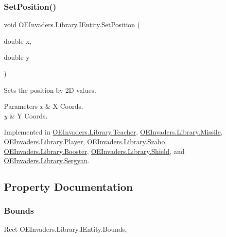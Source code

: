 \subsubsection{\texorpdfstring{SetPosition()}{SetPosition()}}
{\footnotesize\ttfamily void O\+E\+Invaders.\+Library.\+I\+Entity.\+Set\+Position (\begin{DoxyParamCaption}\item[{double}]{x,  }\item[{double}]{y }\end{DoxyParamCaption})}



Sets the position by 2D values. 


\begin{DoxyParams}{Parameters}
{\em x} & X Coords.\\
\hline
{\em y} & Y Coords.\\
\hline
\end{DoxyParams}


Implemented in \mbox{\hyperlink{class_o_e_invaders_1_1_library_1_1_teacher_a5ee45609f0cead5d7aad77b20c5c7be0}{O\+E\+Invaders.\+Library.\+Teacher}}, \mbox{\hyperlink{class_o_e_invaders_1_1_library_1_1_missile_a20c94264f05e7eb7b8e72a07b1a849ea}{O\+E\+Invaders.\+Library.\+Missile}}, \mbox{\hyperlink{class_o_e_invaders_1_1_library_1_1_player_a7dd8d15ddfdb152c2e0c3764a9b35bbc}{O\+E\+Invaders.\+Library.\+Player}}, \mbox{\hyperlink{class_o_e_invaders_1_1_library_1_1_szabo_ac6ad2984cd7d74f7da5e2963f5e69a8f}{O\+E\+Invaders.\+Library.\+Szabo}}, \mbox{\hyperlink{class_o_e_invaders_1_1_library_1_1_booster_a8e4432729479a933b398e0dbdb8f75f7}{O\+E\+Invaders.\+Library.\+Booster}}, \mbox{\hyperlink{class_o_e_invaders_1_1_library_1_1_shield_ae53b795e54cc3b6f985f8cc823811353}{O\+E\+Invaders.\+Library.\+Shield}}, and \mbox{\hyperlink{class_o_e_invaders_1_1_library_1_1_sergyan_a11889323e2933e197f89f40855bc7257}{O\+E\+Invaders.\+Library.\+Sergyan}}.



\subsection{Property Documentation}
\mbox{\label{interface_o_e_invaders_1_1_library_1_1_i_entity_ae2469de47f2a42a16908c13b65293d96}} 
\subsubsection{\texorpdfstring{Bounds}{Bounds}}
{\footnotesize\ttfamily Rect O\+E\+Invaders.\+Library.\+I\+Entity.\+Bounds\hspace{0.3cm}{\ttfamily [get]}, {\ttfamily [set]}}



